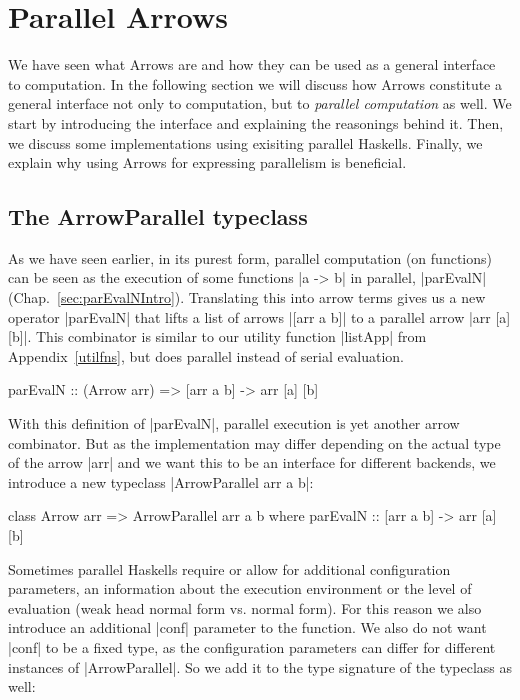 \section{Parallel Arrows}
\label{sec:parallel-arrows}
We have seen what Arrows are and how they can be used as a general interface to computation. In the following section we will discuss how Arrows constitute a general interface not only to computation, but to \textit{parallel computation} as well. We start by introducing the interface and explaining the reasonings behind it. Then, we discuss some implementations using exisiting parallel Haskells. Finally, we explain why using Arrows for expressing parallelism is beneficial.
\subsection{The ArrowParallel typeclass}
As we have seen earlier, in its purest form, parallel computation (on functions) can be seen as the execution of some functions |a -> b| in parallel, |parEvalN| (Chap.~\ref{sec:parEvalNIntro}).
Translating this into arrow terms gives us a new operator |parEvalN| that lifts a list of arrows |[arr a b]| to a parallel arrow |arr [a] [b]|. %
This combinator is similar to our utility function |listApp| from Appendix~\ref{utilfns}, but does parallel instead of serial evaluation.
\begin{code}
parEvalN :: (Arrow arr) => [arr a b] -> arr [a] [b]
\end{code}
With this definition of |parEvalN|, parallel execution is yet another arrow combinator. But as the implementation may differ depending on the actual type of the arrow |arr| and we want this to be an interface for different backends, we introduce a new typeclass |ArrowParallel arr a b|: %
\begin{code}
class Arrow arr => ArrowParallel arr a b where
	parEvalN :: [arr a b] -> arr [a] [b]
\end{code}
Sometimes parallel Haskells require or allow for additional configuration parameters, \eg an information about the execution environment or the level of evaluation (weak head normal form vs. normal form). For this reason we also introduce an additional |conf| parameter to the function. We also do not want |conf| to be a fixed type, as the configuration parameters can differ for different instances of |ArrowParallel|. So we add it to the type signature of the typeclass as well: %
